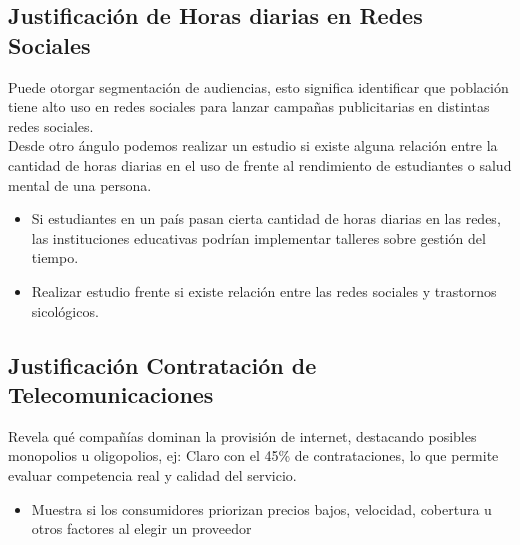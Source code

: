 \documentclass[12pt, a4paper]{article}
\begin{document}
\subsection{Justificación de Horas diarias en Redes Sociales}

Puede otorgar segmentación de audiencias, esto significa identificar que población tiene alto uso en redes sociales para lanzar campañas publicitarias en distintas redes sociales. \\
Desde otro ángulo podemos realizar un estudio si existe alguna relación entre la cantidad de horas diarias en el uso de  frente al rendimiento de estudiantes o salud mental de una persona.

\begin{itemize}
    \item Si estudiantes en un país pasan cierta cantidad de horas diarias en las redes, las instituciones educativas podrían implementar talleres sobre gestión del tiempo.
    \item Realizar estudio frente si existe relación entre las redes sociales y trastornos sicológicos.
\end{itemize}

\subsection{Justificación Contratación de Telecomunicaciones}
Revela qué compañías dominan la provisión de internet, destacando posibles monopolios u oligopolios, ej: Claro con el 45\% de contrataciones, lo que permite evaluar competencia real y calidad del servicio.

\begin{itemize}
    \item Muestra si los consumidores priorizan precios bajos, velocidad, cobertura u otros factores al elegir un proveedor
\end{itemize}
\end{document}
